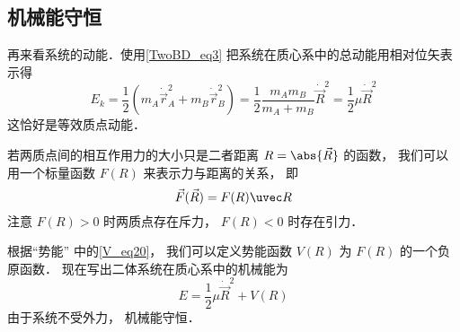 \subsection{机械能守恒}

再来看系统的动能．使用\autoref{TwoBD_eq3} 把系统在质心系中的总动能用相对位矢表示得
\begin{equation}
E_k = \frac 12 (m_A \dot{\vec r}_A^2 + m_B \dot{\vec r}_B^2) = \frac 12 \frac{m_A m_B}{m_A + m_B} \dot{\vec  R}^2 = \frac 12 \mu \dot{\vec  R}^2
\end{equation}
这恰好是等效质点动能．

若两质点间的相互作用力的大小只是二者距离 $R = \abs{\vec R}$ 的函数， 我们可以用一个标量函数 $F(R)$ 来表示力与距离的关系， 即
\begin{equation}
\vec F(\vec R) = F(R) \uvec R
\end{equation}
注意 $F(R)>0$ 时两质点存在斥力， $F(R)<0$ 时存在引力．

根据“势能” 中的\autoref{V_eq20}， 我们可以定义势能函数 $V(R)$ 为 $F(R)$ 的一个负原函数． 现在写出二体系统在质心系中的机械能为
\begin{equation}
E = \frac 12 \mu \dot{\vec  R}^2 + V(R)
\end{equation}
由于系统不受外力， 机械能守恒．